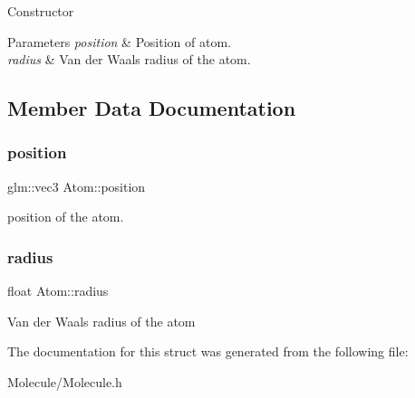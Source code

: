 Constructor


\begin{DoxyParams}{Parameters}
{\em position} & Position of atom. \\
\hline
{\em radius} & Van der Waals radius of the atom. \\
\hline
\end{DoxyParams}


\subsection{Member Data Documentation}
\mbox{\label{struct_atom_a6203936c817773d74620f4644d8551fc}} 
\subsubsection{\texorpdfstring{position}{position}}
{\footnotesize\ttfamily glm\+::vec3 Atom\+::position}

position of the atom. \mbox{\label{struct_atom_abe2d6ad2594dac70d88ec2cfdb73c8e9}} 
\subsubsection{\texorpdfstring{radius}{radius}}
{\footnotesize\ttfamily float Atom\+::radius}

Van der Waals radius of the atom 

The documentation for this struct was generated from the following file\+:\begin{DoxyCompactItemize}
\item 
Molecule/Molecule.\+h\end{DoxyCompactItemize}

